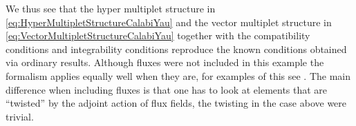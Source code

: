 We thus see that the hyper multiplet structure in \eqref{eq:HyperMultipletStructureCalabiYau} and the vector multiplet structure in \eqref{eq:VectorMultipletStructureCalabiYau} together with the compatibility conditions and integrability conditions reproduce the known conditions obtained via ordinary results. Although fluxes were not included in this example the formalism applies equally well when they are, for examples of this see \cite{Ashmore:2015joa,Ashmore:2016qvs}. The main difference when including fluxes is that one has to look at elements that are ``twisted'' by the adjoint action of flux fields, the twisting in the case above were trivial. 












